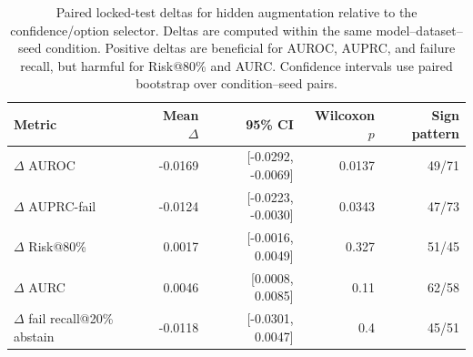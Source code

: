 
\begin{table}[t]
\centering
\small
\caption{Paired locked-test deltas for hidden augmentation relative to the confidence/option selector. Deltas are computed within the same model--dataset--seed condition. Positive deltas are beneficial for AUROC, AUPRC, and failure recall, but harmful for Risk@80\% and AURC. Confidence intervals use paired bootstrap over condition--seed pairs.}
\label{tab:locked-paired-deltas}
\begin{tabular}{lrrrr}
\toprule
Metric & Mean $\Delta$ & 95\% CI & Wilcoxon $p$ & Sign pattern \\
\midrule
$\Delta$ AUROC & -0.0169 & [-0.0292, -0.0069] & 0.0137 & 49/71 \\
$\Delta$ AUPRC-fail & -0.0124 & [-0.0223, -0.0030] & 0.0343 & 47/73 \\
$\Delta$ Risk@80\% & 0.0017 & [-0.0016, 0.0049] & 0.327 & 51/45 \\
$\Delta$ AURC & 0.0046 & [0.0008, 0.0085] & 0.11 & 62/58 \\
$\Delta$ fail recall@20\% abstain & -0.0118 & [-0.0301, 0.0047] & 0.4 & 45/51 \\
\bottomrule
\end{tabular}
\end{table}
